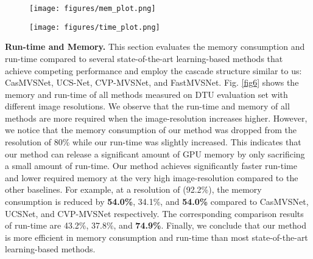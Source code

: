 \documentclass{article} \usepackage{iclr2022_conference,times}
\begin{document}
\begin{figure*}
\begin{subfigure}{0.5\linewidth}
\centering
\texttt{[image: figures/mem\_plot.png]}
\label{fig6a}
\end{subfigure}
\begin{subfigure}{0.5\linewidth}
\centering
\texttt{[image: figures/time\_plot.png]}
\label{fig6b}
\end{subfigure}
\caption{Relating GPU memory and run-time to the input resolution on DTU's evaluation set. The original image resolution is  (100\%).  Here we evaluate at the highest resolution  (95.2\%). }
\vspace{-0.5cm}
\label{fig6}

\end{figure*}
\textbf{Run-time and Memory.} This section evaluates the memory consumption and run-time compared to several state-of-the-art learning-based methods that achieve competing performance and employ the cascade structure similar to us: CasMVSNet, UCS-Net, CVP-MVSNet, and FastMVSNet. Fig. \ref{fig6} shows the memory and run-time of all methods measured on DTU evaluation set with different image resolutions. We observe that the run-time and memory of all methods are more required when the image-resolution increases higher. However, we notice that the memory consumption of our method was dropped from the resolution of 80\% while our run-time was slightly increased. This indicates that our method can release a significant amount of GPU memory by only sacrificing a small amount of run-time. Our method achieves significantly faster run-time and lower required memory at the very high image-resolution compared to the other baselines. For example, at a resolution of  (92.2\%), the memory consumption is reduced by \textbf{54.0\%}, 34.1\%, and \textbf{54.0\%} compared to CasMVSNet, UCSNet, and CVP-MVSNet respectively. The corresponding comparison results of run-time are  43.2\%, 37.8\%, and \textbf{74.9\%}. Finally, we conclude that our method is more efficient in memory consumption and run-time than most state-of-the-art learning-based methods. 
\vspace{-0.25cm}
\end{document}
